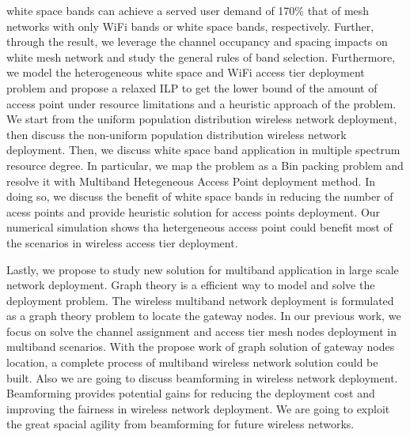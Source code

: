 white space bands can achieve a served user demand of 170\% that of mesh networks 
with only WiFi bands or white space bands, respectively. Further, through the 
result, we leverage the channel occupancy and spacing impacts on white mesh
network and study the general rules of band selection.
Furthermore, we model the heterogeneous white space and WiFi access tier 
deployment problem and propose a relaxed ILP to get the lower bound of the 
amount of access point under resource limitations and a heuristic approach 
of the problem. We start from the uniform population distribution wireless 
network deployment, then discuss the non-uniform population distribution 
wireless network deployment. Then, we discuss white space band application
in multiple spectrum resource degree. In particular, we map the problem as 
a Bin packing problem and resolve it with Multiband Hetegeneous Access Point 
deployment method. In doing so, we discuss the benefit of white space bands 
in reducing the number of acess points and provide heuristic solution for 
access points deployment. Our numerical simulation shows tha hetergeneous 
access point could benefit most of the scenarios in wireless access tier 
deployment.

Lastly, we propose to study new solution for multiband application in large 
scale network deployment. Graph theory is a efficient way to model and solve 
the deployment problem. The wireless multiband network deployment is formulated
as a graph theory problem to locate the gateway nodes. In our previous work,
we focus on solve the channel assignment and access tier mesh nodes deployment
in multiband scenarios. With the propose work of graph solution of gateway nodes
location, a complete process of multiband wireless network solution could be 
built. Also we are going to discuss beamforming in wireless network deployment. 
Beamforming provides potential gains for reducing the deployment cost and improving
the fairness in wireless network deployment. We are going to exploit the great
spacial agility from beamforming for future wireless networks.

